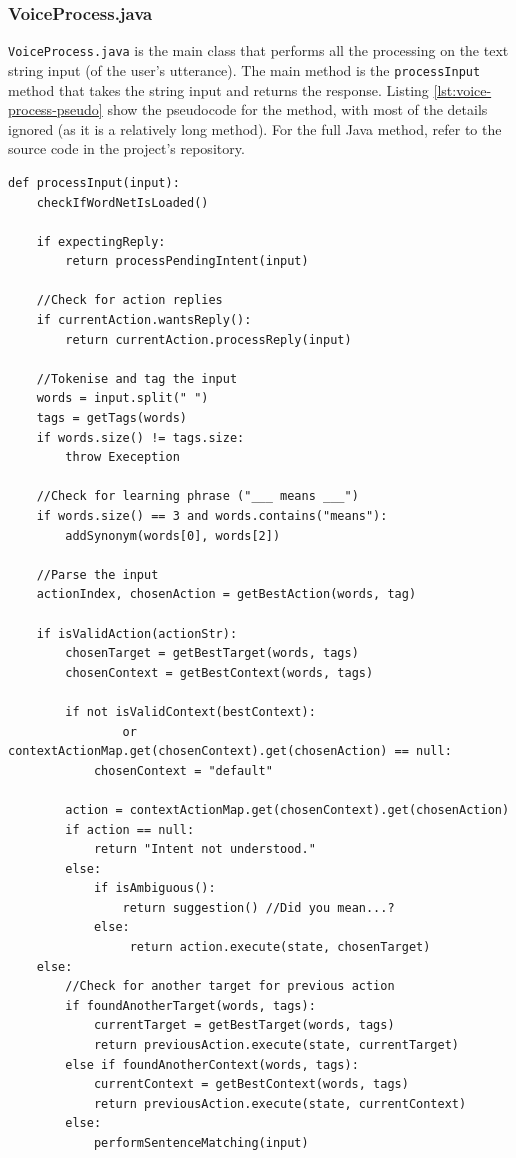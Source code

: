 \documentclass[11pt]{article}
\begin{document}
\subsubsection{VoiceProcess.java}

\texttt{VoiceProcess.java} is the main class that performs all the processing on the text string input (of the user's utterance). The main method is the \texttt{processInput} method that takes the string input and returns the response. Listing \ref{lst:voice-process-pseudo} show the pseudocode for the method, with most of the details ignored (as it is a relatively long method). For the full Java method, refer to the source code in the project's repository.

\begin{lstlisting}[caption=VoiceProcess.processInput() pseudocode, label={lst:voice-process-pseudo}]
def processInput(input):
    checkIfWordNetIsLoaded()
    
    if expectingReply:
        return processPendingIntent(input)
    
    //Check for action replies
    if currentAction.wantsReply():
        return currentAction.processReply(input)
    
    //Tokenise and tag the input
    words = input.split(" ")
    tags = getTags(words)
    if words.size() != tags.size:
        throw Exeception
    
    //Check for learning phrase ("___ means ___")
    if words.size() == 3 and words.contains("means"):
        addSynonym(words[0], words[2])
    
    //Parse the input
    actionIndex, chosenAction = getBestAction(words, tag)
    
    if isValidAction(actionStr):
        chosenTarget = getBestTarget(words, tags)
        chosenContext = getBestContext(words, tags)
        
        if not isValidContext(bestContext):
                or contextActionMap.get(chosenContext).get(chosenAction) == null:
            chosenContext = "default"
            
        action = contextActionMap.get(chosenContext).get(chosenAction)
        if action == null:
            return "Intent not understood."
        else:
            if isAmbiguous():
                return suggestion()	//Did you mean...?
            else:
                 return action.execute(state, chosenTarget)
    else:
    	//Check for another target for previous action
        if foundAnotherTarget(words, tags):
            currentTarget = getBestTarget(words, tags)
            return previousAction.execute(state, currentTarget)
        else if foundAnotherContext(words, tags):
            currentContext = getBestContext(words, tags)
            return previousAction.execute(state, currentContext)
        else:
            performSentenceMatching(input)
\end{lstlisting}
\end{document}
